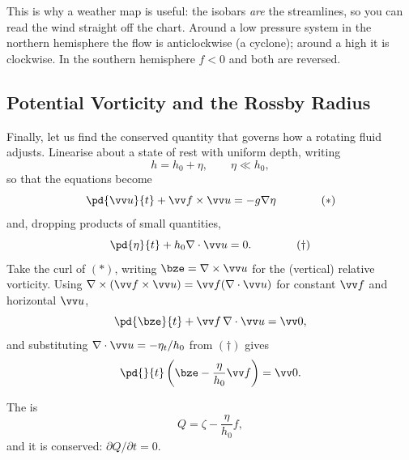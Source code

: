 \begin{center}
\end{center}

This is why a weather map is useful: the isobars \emph{are} the streamlines, so you can read the wind straight off the chart. Around a low pressure system in the northern hemisphere the flow is anticlockwise (a cyclone); around a high it is clockwise. In the southern hemisphere $f < 0$ and both are reversed.

\subsection{Potential Vorticity and the Rossby Radius}

Finally, let us find the conserved quantity that governs how a rotating fluid adjusts. Linearise about a state of rest with uniform depth, writing
$$
h = h_0 + \eta, \qquad \eta \ll h_0,
$$
so that the equations become
$$
\pd{\vv u}{t} + \vv f\times\vv u = -g\nabla\eta \qquad\qquad (*)
$$
and, dropping products of small quantities,
$$
\pd{\eta}{t} + h_0 \nabla\cdot\vv u = 0. \qquad\qquad (\dagger)
$$
Take the curl of $(*)$, writing $\bze = \nabla\times\vv u$ for the (vertical) relative vorticity. Using $\nabla\times(\vv f \times \vv u) = \vv f(\nabla\cdot\vv u)$ for constant $\vv f$ and horizontal $\vv u$,
$$
\pd{\bze}{t} + \vv f \, \nabla\cdot\vv u = \vv 0,
$$
and substituting $\nabla\cdot\vv u = -\eta_t/h_0$ from $(\dagger)$ gives
$$
\pd{}{t}\left(\bze - \frac{\eta}{h_0}\vv f\right) = \vv 0.
$$

\begin{definition}
	The  is
	$$
	Q = \zeta - \frac{\eta}{h_0}f,
	$$
	and it is conserved: $\partial Q/\partial t = 0$.
\end{definition}

